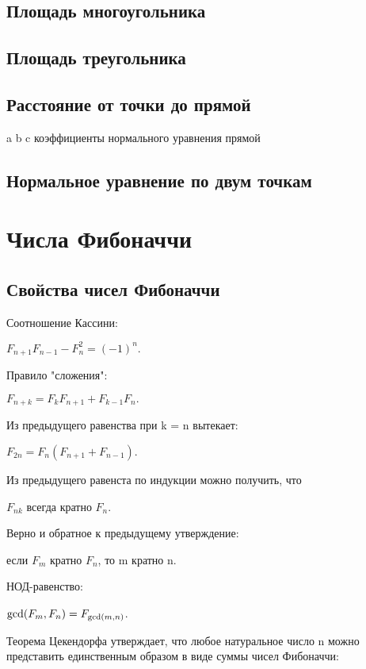 \documentclass[a4paper]{article}
\begin{document}
\begin{multicols*}{2}
		 \subsection{Площадь многоугольника}
		 		 
		 \subsection{Площадь треугольника}
		 
		 \subsection{Расстояние от точки до прямой}
		 a b c коэффициенты нормального уравнения прямой
		 
		 \subsection{Нормальное уравнение по двум точкам}
		 	
		 
		 \section{Числа Фибоначчи}		 
		 \subsection{Свойства чисел Фибоначчи}
		 
		 Соотношение Кассини:
		 
		 $F_{n+1} F_{n-1} - F_n^2 = (-1)^n.$
		 
		 Правило "сложения":
		 
		 $F_{n+k} = F_k F_{n+1} + F_{k-1} F_n.$ 
		 
		 Из предыдущего равенства при k = n вытекает:
		 
		 $F_{2n} = F_n (F_{n+1} + F_{n-1}).$ 
		 
		 Из предыдущего равенста по индукции можно получить, что
		 
		 $F_{nk}$ всегда кратно $F_n$.
		 
		 Верно и обратное к предыдущему утверждение:
		 
		 если $F_m$ кратно $F_n$, то m кратно n.
		 
		 НОД-равенство:
		 
		 ${\rm gcd} (F_m, F_n) = F_{{\rm gcd} (m, n)}$. 
		 
		 Теорема Цекендорфа утверждает, что любое натуральное число n можно представить единственным образом в виде суммы чисел Фибоначчи:
		 

\end{multicols*}
\end{document}
